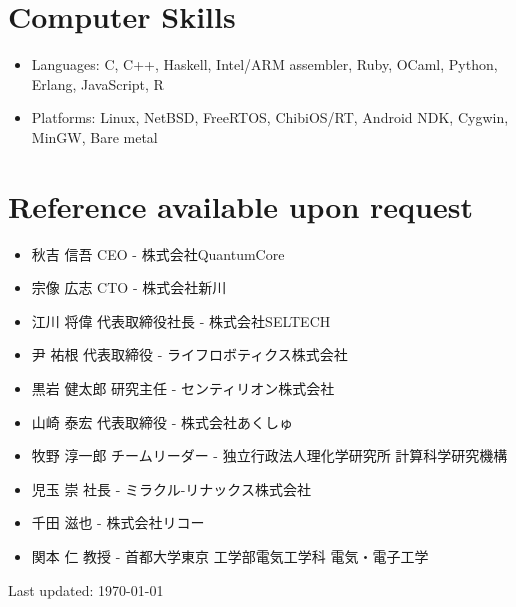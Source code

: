 \documentclass[letterpaper]{article}
\def\footer{
  \begin{center}
    \begin{footnotesize}
      Last updated: \today
    \end{footnotesize}
  \end{center}
}
\begin{document}
\section*{Computer Skills}

\begin{itemize}
  \item Languages: C, C++, Haskell, Intel/ARM assembler, Ruby, OCaml, Python, Erlang, JavaScript, R
  \item Platforms: Linux, NetBSD, FreeRTOS, ChibiOS/RT, Android NDK, Cygwin, MinGW, Bare metal
\end{itemize}

\section*{Reference available upon request}

\begin{itemize}
  \item 秋吉 信吾 CEO - 株式会社QuantumCore
  \item 宗像 広志 CTO - 株式会社新川
  \item 江川 将偉 代表取締役社長 - 株式会社SELTECH
  \item 尹 祐根 代表取締役 - ライフロボティクス株式会社
  \item 黒岩 健太郎 研究主任 - センティリオン株式会社
  \item 山崎 泰宏 代表取締役 - 株式会社あくしゅ
  \item 牧野 淳一郎 チームリーダー - 独立行政法人理化学研究所 計算科学研究機構
  \item 児玉 崇 社長 - ミラクル-リナックス株式会社
  \item 千田 滋也 - 株式会社リコー
  \item 関本 仁 教授 - 首都大学東京 工学部電気工学科 電気・電子工学
\end{itemize}

\bigskip
\footer
\end{document}
